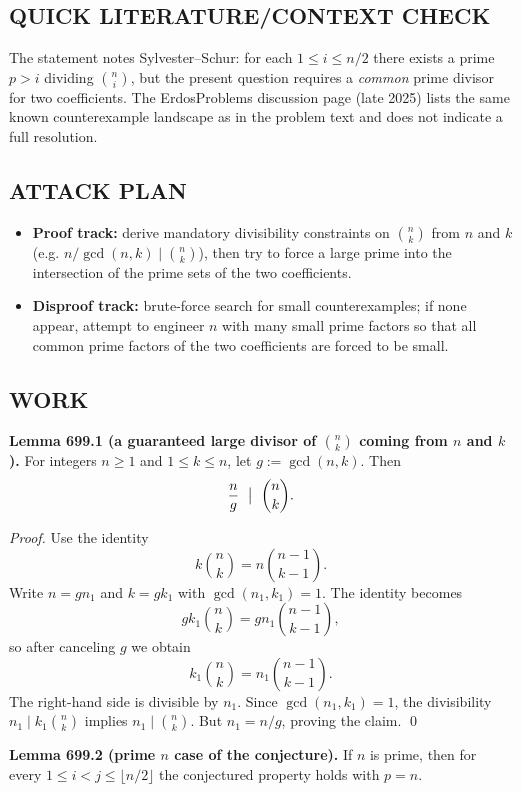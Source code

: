 \subsection*{QUICK LITERATURE/CONTEXT CHECK}
The statement notes Sylvester--Schur: for each $1\le i\le n/2$ there exists a prime $p>i$ dividing $\binom{n}{i}$, but the present question requires a \emph{common} prime divisor for two coefficients. The ErdosProblems discussion page (late 2025) lists the same known counterexample landscape as in the problem text and does not indicate a full resolution.

\subsection*{ATTACK PLAN}
\begin{itemize}
\item \textbf{Proof track:} derive mandatory divisibility constraints on $\binom{n}{k}$ from $n$ and $k$ (e.g. $n/\gcd(n,k)\mid \binom{n}{k}$), then try to force a large prime into the intersection of the prime sets of the two coefficients.
\item \textbf{Disproof track:} brute-force search for small counterexamples; if none appear, attempt to engineer $n$ with many small prime factors so that all common prime factors of the two coefficients are forced to be small.
\end{itemize}

\subsection*{WORK}
\textbf{Lemma 699.1 (a guaranteed large divisor of $\binom{n}{k}$ coming from $n$ and $k$).}
For integers $n\ge 1$ and $1\le k\le n$, let $g:=\gcd(n,k)$. Then
\[\frac{n}{g}\ \bigm|\ \binom{n}{k}.
\]

\emph{Proof.}
Use the identity
\[k\binom{n}{k}=n\binom{n-1}{k-1}.
\]
Write $n=gn_1$ and $k=gk_1$ with $\gcd(n_1,k_1)=1$. The identity becomes
\[gk_1\binom{n}{k}=gn_1\binom{n-1}{k-1},\]
so after canceling $g$ we obtain
\[k_1\binom{n}{k}=n_1\binom{n-1}{k-1}.
\]
The right-hand side is divisible by $n_1$. Since $\gcd(n_1,k_1)=1$, the divisibility $n_1\mid k_1\binom{n}{k}$ implies $n_1\mid \binom{n}{k}$. But $n_1=n/g$, proving the claim. \qed

\medskip
\textbf{Lemma 699.2 (prime $n$ case of the conjecture).}
If $n$ is prime, then for every $1\le i<j\le \lfloor n/2\rfloor$ the conjectured property holds with $p=n$.


